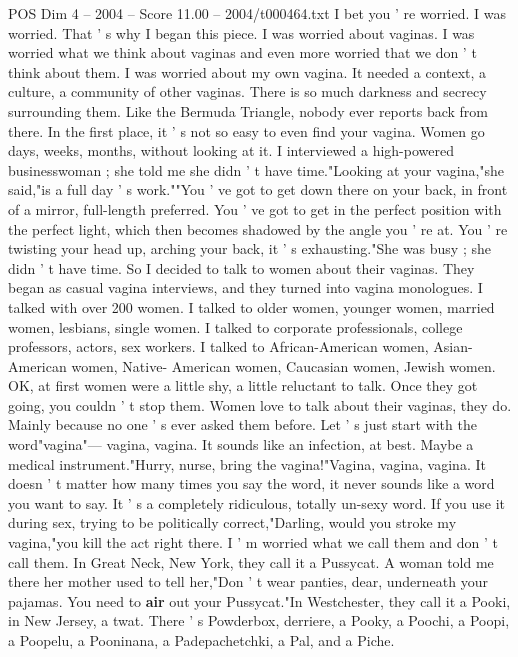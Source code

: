 \begin{textsample}{POS Dim 4 – 2004 – Score 11.00 – 2004/t000464.txt}  \label{ex:f4_pos_060}
I bet you ' re worried.
I was worried.
That ' s why I began this piece.
I was worried about vaginas.
I was worried what we think about vaginas and even more worried that we don ' t think about them.
I was worried about my own vagina.
It needed a context, a culture, a community of other vaginas.
There is so much darkness and secrecy surrounding them.
Like the Bermuda Triangle, nobody ever reports back from there.
In the first place, it ' s not so easy to even find your vagina.
Women go days, weeks, months, without looking at it.
I interviewed a high-powered businesswoman ; she told me she didn ' t have time."Looking at your vagina,"she said,"is a full day ' s work.""You ' ve got to get down there on your back, in front of a mirror, full-length preferred.
You ' ve got to get in the perfect position with the perfect light, which then becomes shadowed by the angle you ' re at.
You ' re twisting your head up, arching your back, it ' s exhausting."She was busy ; she didn ' t have time.
So I decided to talk to women about their vaginas.
They began as casual vagina interviews, and they turned into vagina monologues.
I talked with over 200 women.
I talked to older women, younger women, married women, lesbians, single women.
I talked to corporate professionals, college professors, actors, sex workers.
I talked to African-American women, Asian-American women, Native- American women, Caucasian women, Jewish women.
OK, at first women were a little shy, a little reluctant to talk.
Once they got going, you couldn ' t stop them.
Women love to talk about their vaginas, they do.
Mainly because no one ' s ever asked them before.
Let ' s just start with the word"vagina"— vagina, vagina.
It sounds like an infection, at best.
Maybe a medical instrument."Hurry, nurse, bring the vagina!"Vagina, vagina, vagina.
It doesn ' t matter how many times you say the word, it never sounds like a word you want to say.
It ' s a completely ridiculous, totally un-sexy word.
If you use it during sex, trying to be politically correct,"Darling, would you stroke my vagina,"you kill the act right there.
I ' m worried what we call them and don ' t call them.
In Great Neck, New York, they call it a Pussycat.
A woman told me there her mother used to tell her,"Don ' t wear panties, dear, underneath your pajamas.
You need to \textbf{air} out your Pussycat."In Westchester, they call it a Pooki, in New Jersey, a twat.
There ' s Powderbox, derriere, a Pooky, a Poochi, a Poopi, a Poopelu, a Pooninana, a Padepachetchki, a Pal, and a Piche.

\end{textsample}

